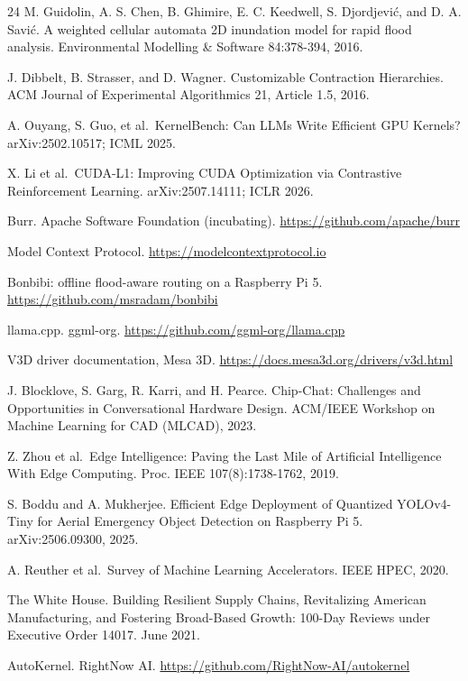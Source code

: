 \documentclass[conference]{IEEEtran}
\begin{document}
%
\begin{thebibliography}{24}
\scriptsize
{} M. Guidolin, A. S. Chen, B. Ghimire, E. C. Keedwell, S.
Djordjević, and D. A. Savić. A weighted cellular automata 2D inundation
model for rapid flood analysis. Environmental Modelling \& Software
84:378-394, 2016.

 J. Dibbelt, B. Strasser, and D. Wagner. Customizable Contraction
Hierarchies. ACM Journal of Experimental Algorithmics 21, Article 1.5,
2016.

 A. Ouyang, S. Guo, et al.~KernelBench: Can LLMs Write Efficient
GPU Kernels? arXiv:2502.10517; ICML 2025.

 X. Li et al.~CUDA-L1: Improving CUDA Optimization via
Contrastive Reinforcement Learning. arXiv:2507.14111; ICLR 2026.

 Burr. Apache Software Foundation (incubating).
\url{https://github.com/apache/burr}

 Model Context Protocol. \url{https://modelcontextprotocol.io}

 Bonbibi: offline flood-aware routing on a Raspberry Pi 5.
\url{https://github.com/msradam/bonbibi}

 llama.cpp. ggml-org. \url{https://github.com/ggml-org/llama.cpp}

 V3D driver documentation, Mesa 3D.
\url{https://docs.mesa3d.org/drivers/v3d.html}

 J. Blocklove, S. Garg, R. Karri, and H. Pearce. Chip-Chat:
Challenges and Opportunities in Conversational Hardware Design. ACM/IEEE
Workshop on Machine Learning for CAD (MLCAD), 2023.

 Z. Zhou et al.~Edge Intelligence: Paving the Last Mile of
Artificial Intelligence With Edge Computing. Proc. IEEE
107(8):1738-1762, 2019.

 S. Boddu and A. Mukherjee. Efficient Edge Deployment of
Quantized YOLOv4-Tiny for Aerial Emergency Object Detection on Raspberry
Pi 5. arXiv:2506.09300, 2025.

 A. Reuther et al.~Survey of Machine Learning Accelerators. IEEE
HPEC, 2020.

 The White House. Building Resilient Supply Chains, Revitalizing
American Manufacturing, and Fostering Broad-Based Growth: 100-Day
Reviews under Executive Order 14017. June 2021.

 AutoKernel. RightNow AI.
\url{https://github.com/RightNow-AI/autokernel}


\end{thebibliography}
\end{document}
